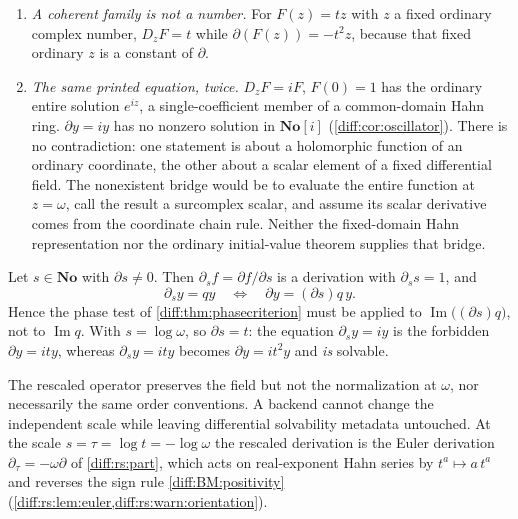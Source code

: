 \documentclass[11pt,letterpaper]{article}
\numberwithin{equation}{section}
\theoremstyle{definition}
\theoremstyle{remark}
\newcommand{\No}{\mathbf{No}}
\newcommand{\SC}{\mathbf{No}[i]}
\newcommand{\der}{\partial}
\newcommand{\Imm}{\operatorname{Im}}
\newcommand{\Dz}{D_{z}}
\newcommand{\derT}{\der_{\tau}}
\begin{document}
\begin{warning}
\begin{enumerate}[label=(\arabic*),leftmargin=2.4em]
$F(z,t)=tz$ at $z=\omega$, $t=\omega^{-1}$, the value is $1$ and
\[
 \der F=t\,\der\omega+\omega\,\der t=t-\omega t^{2}=0,
\]
whereas the coordinate derivative $\Dz F=t$ alone would return $t$. Here the
ordinary multivariable chain rule is valid; what is wrong is dropping a
variable. The same point in one variable: for $F(Z)=tZ$ and $x=\omega$,
$\der(F(\omega))=(-t^{2})\omega+t=0$, as it must be.
\item\emph{A coherent family is not a number.} For $F(z)=tz$ with $z$ a fixed
ordinary complex number, $\Dz F=t$ while $\der(F(z))=-t^{2}z$, because that
fixed ordinary $z$ is a constant of $\der$.
\item\emph{The same printed equation, twice.} $\Dz F=iF$, $F(0)=1$ has the
ordinary entire solution $e^{iz}$, a single-coefficient member of a
common-domain Hahn ring. $\der y=iy$ has no nonzero solution in $\SC$
(\cref{diff:cor:oscillator}). There is no contradiction: one statement is
about a holomorphic function of an ordinary coordinate, the other about a
scalar element of a fixed differential field. The nonexistent bridge would be
to evaluate the entire function at $z=\omega$, call the result a surcomplex
scalar, and assume its scalar derivative comes from the coordinate chain rule.
Neither the fixed-domain Hahn representation nor the ordinary initial-value
theorem supplies that bridge.
\end{enumerate}
\end{warning}

\begin{proposition}
\label{diff:prop:rescale}
Let $s\in\No$ with $\der s\neq0$. Then $\der_{s}f=\der f/\der s$ is a
derivation with $\der_{s}s=1$, and
\[
 \der_{s}y=qy \quad\Longleftrightarrow\quad \der y=(\der s)q\,y .
\]
Hence the phase test of \cref{diff:thm:phasecriterion} must be applied to
$\Imm\bigl((\der s)q\bigr)$, not to $\Imm q$. With $s=\log\omega$, so
$\der s=t$: the equation $\der_{s}y=iy$ is the forbidden $\der y=ity$, whereas
$\der_{s}y=ity$ becomes $\der y=it^{2}y$ and \emph{is} solvable.
\end{proposition}

The rescaled operator preserves the field but not the normalization at
$\omega$, nor necessarily the same order conventions. A backend cannot change
the independent scale while leaving differential solvability metadata
untouched. At the scale $s=\tau=\log t=-\log\omega$ the rescaled derivation is
the Euler derivation $\derT=-\omega\der$ of \cref{diff:rs:part}, which acts on
real-exponent Hahn series by $t^{a}\mapsto a\,t^{a}$ and reverses the sign rule
\ref{diff:BM:positivity} (\cref{diff:rs:lem:euler,diff:rs:warn:orientation}).
\end{document}
